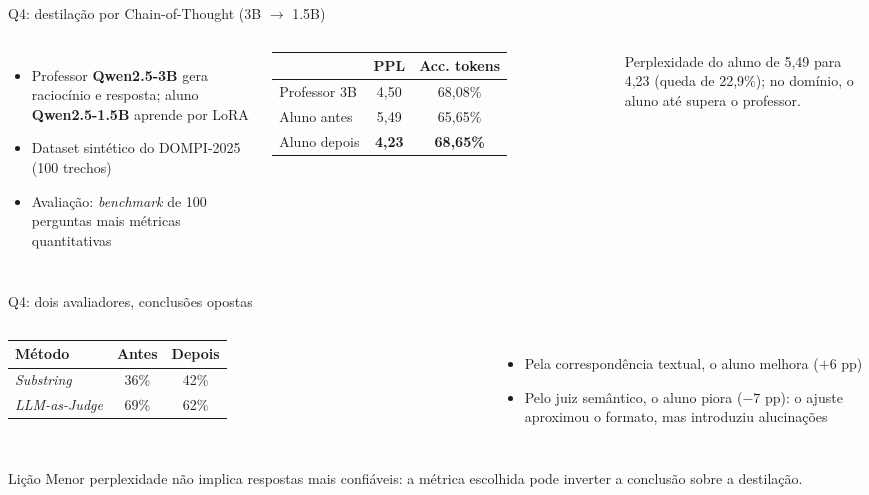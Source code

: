 \documentclass[10pt,aspectratio=169]{beamer}
\newcommand{\antes}[1]{{\color{LaranjaAntes}#1}}
\newcommand{\depois}[1]{{\color{VerdeDepois}#1}}
\begin{document}
\begin{frame}{Q4: destilação por Chain-of-Thought (3B $\to$ 1.5B)}
  \begin{columns}[T]
      \begin{itemize}
        \item Professor \textbf{Qwen2.5-3B} gera raciocínio e resposta; aluno \textbf{Qwen2.5-1.5B} aprende por LoRA
        \item Dataset sintético do DOMPI-2025 (100 trechos)
        \item Avaliação: \textit{benchmark} de 100 perguntas mais métricas quantitativas
      \end{itemize}
      \small
      \begin{tabular}{@{}l c c@{}}
        \toprule
        & \textbf{PPL} & \textbf{Acc. tokens} \\
        \midrule
        Professor 3B          & 4,50 & 68,08\% \\
        \antes{Aluno antes}    & 5,49 & 65,65\% \\
        \depois{Aluno depois}  & \textbf{4,23} & \textbf{68,65\%} \\
        \bottomrule
      \end{tabular}
      \vspace{0.8em}

      Perplexidade do aluno de \antes{5,49} para \depois{4,23} (queda de 22,9\%); no domínio, o aluno até supera o professor.
  \end{columns}
\end{frame}

\begin{frame}{Q4: dois avaliadores, conclusões opostas}
  \begin{columns}[T]
      \small
      \begin{tabular}{@{}l c c@{}}
        \toprule
        \textbf{Método} & \textbf{Antes} & \textbf{Depois} \\
        \midrule
        \textit{Substring}    & 36\% & \depois{42\%} \\
        \textit{LLM-as-Judge} & \alert{69\%} & 62\% \\
        \bottomrule
      \end{tabular}
      \begin{itemize}
        \item Pela correspondência textual, o aluno \depois{melhora} ($+6$ pp)
        \item Pelo juiz semântico, o aluno \alert{piora} ($-7$ pp): o ajuste aproximou o formato, mas introduziu alucinações
      \end{itemize}
  \end{columns}
  \vfill
  \begin{alertblock}{Lição}
    Menor perplexidade não implica respostas mais confiáveis: a métrica escolhida pode inverter a conclusão sobre a destilação.
  \end{alertblock}
\end{frame}
\end{document}
